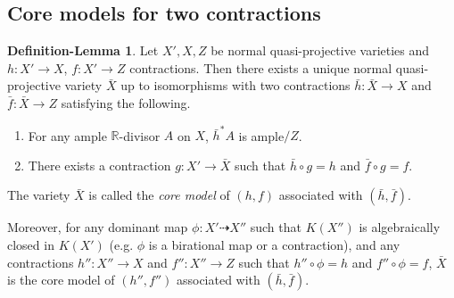 \documentclass[11pt]{amsart}
\numberwithin{equation}{section}
\newcommand{\Rr}{\mathbb{R}}
\theoremstyle{definition}
\theoremstyle{definition}
\newtheorem{deflem}[thm]{Definition-Lemma}
\theoremstyle{definition}
\begin{document}
\subsection{Core models for two contractions}



\begin{deflem}\label{deflem: relative ample model}
    Let $X',X,Z$ be normal quasi-projective varieties and $h: X'\rightarrow X$, $f: X'\rightarrow Z$ contractions. Then there exists a unique normal quasi-projective variety $\bar X$ up to isomorphisms with two contractions $\bar h: \bar X\rightarrow X$ and $\bar f: \bar X\rightarrow Z$ satisfying the following.
    \begin{enumerate}
        \item  For any ample  $\Rr$-divisor $A$ on $X$, $\bar h^*A$ is ample$/Z$.
        \item  There exists a contraction $g: X'\rightarrow \bar X$ such that $\bar h\circ g=h$ and $\bar f\circ g=f$.
    \end{enumerate}
The variety $\bar X$ is called the \emph{core model} of $(h,f)$ associated with $(\bar h,\bar f)$.

Moreover, for any dominant map $\phi: X'\dashrightarrow X''$ such that $K(X'')$ is algebraically closed in $K(X')$ (e.g. $\phi$ is a birational map or a contraction), and any contractions $h'': X''\rightarrow X$ and $f'': X''\rightarrow Z$ such that $h''\circ\phi=h$ and $f''\circ\phi=f$, $\bar X$ is the core model of $(h'',f'')$ associated with $(\bar h,\bar f)$.
\end{deflem}
\end{document}
